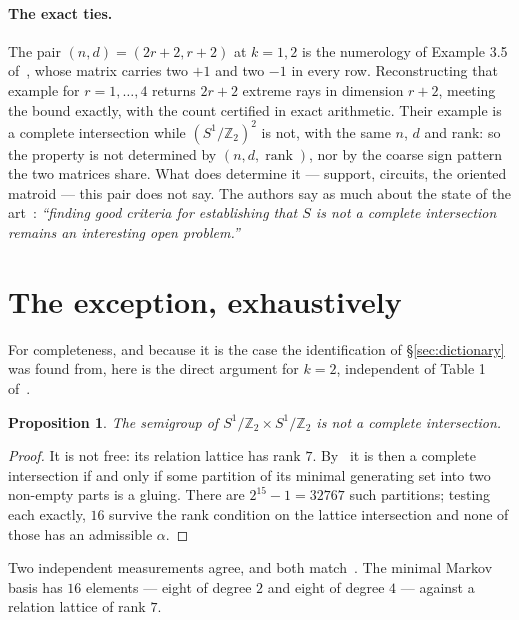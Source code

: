 \documentclass[11pt,a4paper]{article}
\newtheorem{proposition}{Proposition}
\theoremstyle{definition}
\newcommand{\ZZ}{\mathbb{Z}}
\begin{document}
\paragraph{The exact ties.} The pair $(n,d)=(2r+2,r+2)$ at $k=1,2$ is the numerology of Example 3.5
of~\cite{FMS}, whose matrix carries two $+1$ and two $-1$ in every row. Reconstructing that example
for $r=1,\dots,4$ returns $2r+2$ extreme rays in dimension $r+2$, meeting the bound exactly, with the
count certified in exact arithmetic. Their example is a complete intersection while $(S^1/\ZZ_2)^2$
is not, with the same $n$, $d$ and rank: so the property is not determined by $(n,d,\operatorname{rank})$,
nor by the coarse sign pattern the two matrices share. What does determine it --- support, circuits,
the oriented matroid --- this pair does not say. The authors say as much about the state of the art~\cite[p.~3144]{FMS}: \emph{``finding
good criteria for establishing that $S$ is not a complete intersection remains an interesting open
problem.''}

\section{The exception, exhaustively}\label{sec:exception}

For completeness, and because it is the case the identification of \S\ref{sec:dictionary} was found
from, here is the direct argument for $k=2$, independent of Table 1 of~\cite{SScuts}.

\begin{proposition}\label{prop:notci}
The semigroup of $S^1/\ZZ_2\times S^1/\ZZ_2$ is not a complete intersection.
\end{proposition}

\begin{proof}
It is not free: its relation lattice has rank $7$. By~\cite{FMS} it is then a complete intersection
if and only if some partition of its minimal generating set into two non-empty parts is a gluing.
There are $2^{15}-1=32767$ such partitions; testing each exactly, $16$ survive the rank condition on
the lattice intersection and none of those has an admissible $\alpha$.
\end{proof}

Two independent measurements agree, and both match~\cite{SScuts}. The minimal Markov basis has $16$
elements --- eight of degree $2$ and eight of degree $4$ --- against a relation lattice of rank $7$.
\end{document}

